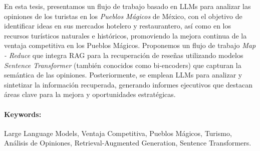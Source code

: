 \documentclass[letterpaper,12pt,twoside]{book}  %
\begin{document}
En esta tesis, presentamos un flujo de trabajo basado en LLMs para analizar las opiniones de los turistas en los \textit{Pueblos Mágicos} de México, con el objetivo de identificar ideas en sus mercados hotelero y restaurantero, así como en los recursos turísticos naturales e históricos, promoviendo la mejora continua de la ventaja competitiva en los Pueblos Mágicos. Proponemos un flujo de trabajo \textit{Map - Reduce} que integra RAG para la recuperación de reseñas utilizando modelos \textit{Sentence Transformer} (también conocidos como bi-encoders) que capturan la semántica de las opiniones. Posteriormente, se emplean LLMs para analizar y sintetizar la información recuperada, generando informes ejecutivos que destacan áreas clave para la mejora y oportunidades estratégicas.


\paragraph{Keywords:} Large Language Models, Ventaja Competitiva, Pueblos Mágicos, Turismo, Análisis de Opiniones, Retrieval-Augmented Generation, Sentence Transformers.



\tableofcontents

\listoffigures

\mainmatter















\appendix


\backmatter
\end{document}
